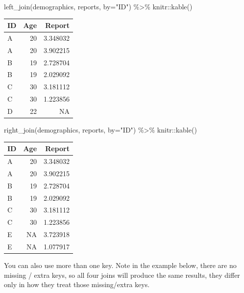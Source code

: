 \documentclass[
]{book}
\newenvironment{Shaded}{\begin{snugshade}}{\end{snugshade}}
\newcommand{\AttributeTok}[1]{\textcolor[rgb]{0.77,0.63,0.00}{#1}}
\newcommand{\FunctionTok}[1]{\textcolor[rgb]{0.00,0.00,0.00}{#1}}
\newcommand{\NormalTok}[1]{#1}
\newcommand{\SpecialCharTok}[1]{\textcolor[rgb]{0.00,0.00,0.00}{#1}}
\newcommand{\StringTok}[1]{\textcolor[rgb]{0.31,0.60,0.02}{#1}}
\begin{document}
\begin{Shaded}
\begin{Highlighting}[]
\FunctionTok{left\_join}\NormalTok{(demographics, reports, }\AttributeTok{by=}\StringTok{"ID"}\NormalTok{) }\SpecialCharTok{\%\textgreater{}\%}
\NormalTok{  knitr}\SpecialCharTok{::}\FunctionTok{kable}\NormalTok{()}
\end{Highlighting}
\end{Shaded}

\begin{tabular}{l|r|r}
\hline
ID & Age & Report\\
\hline
A & 20 & 3.348032\\
\hline
A & 20 & 3.902215\\
\hline
B & 19 & 2.728704\\
\hline
B & 19 & 2.029092\\
\hline
C & 30 & 3.181112\\
\hline
C & 30 & 1.223856\\
\hline
D & 22 & NA\\
\hline
\end{tabular}

\begin{Shaded}
\begin{Highlighting}[]
\FunctionTok{right\_join}\NormalTok{(demographics, reports, }\AttributeTok{by=}\StringTok{"ID"}\NormalTok{) }\SpecialCharTok{\%\textgreater{}\%}
\NormalTok{  knitr}\SpecialCharTok{::}\FunctionTok{kable}\NormalTok{()}
\end{Highlighting}
\end{Shaded}

\begin{tabular}{l|r|r}
\hline
ID & Age & Report\\
\hline
A & 20 & 3.348032\\
\hline
A & 20 & 3.902215\\
\hline
B & 19 & 2.728704\\
\hline
B & 19 & 2.029092\\
\hline
C & 30 & 3.181112\\
\hline
C & 30 & 1.223856\\
\hline
E & NA & 3.723918\\
\hline
E & NA & 1.077917\\
\hline
\end{tabular}

You can also use more than one key. Note in the example below, there are no missing / extra keys, so all four joins will produce the same results, they differ only in how they treat those missing/extra keys.
\end{document}
